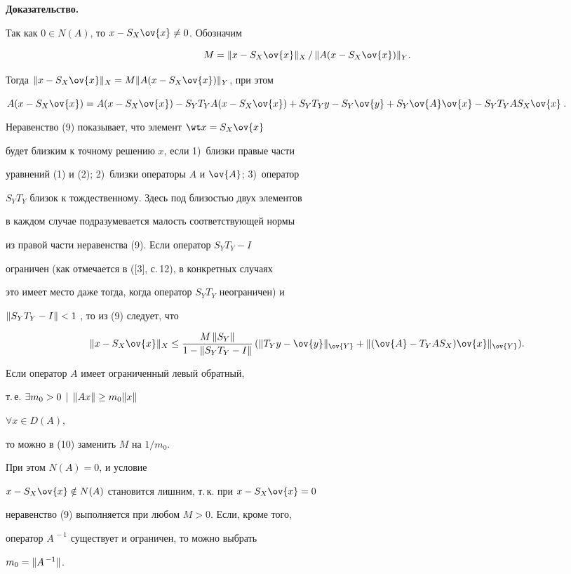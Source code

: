 {\bf Доказательство.}


Так как $0 \in N(A)$, то $x-S_X\ov{x}\ne0$. Обозначим


$$


M=\nr{x-S_X\ov{x}}_X\,/\,\nr{A(x- S_X\ov{x})}_Y.


$$


Тогда $\nr{x-S_X\ov{x}}_X=M\nr{A(x-S_X\ov{x})}_Y$, при этом


$A(x-S_X\ov{x}) = A(x-S_X\ov{x})-S_YT_YA(x-S_X\ov{x})+S_YT_Yy-S_Y\ov{y} +


S_Y\ov{A}\ov{x} -S_YT_YAS_X\ov{x}$.





\begin{note} Неравенство (9) показывает, что элемент $\wt x =S_X\ov{x}$


будет близким к точному решению $x$, если 1)~близки правые части


уравнений (1) и (2); 2)~близки операторы $A$ и $\ov{A}$; 3)~оператор


$S_YT_Y$ близок к тождественному. Здесь под близостью двух элементов


в каждом случае подразумевается малость соответствующей нормы


из правой части неравенства (9). Если оператор $S_YT_Y-I$


ограничен (как отмечается в ([3], с.\,12), в конкретных случаях


это имеет место даже тогда, когда оператор $S_YT_Y$ неограничен) и


$\| {S_YT_Y-I} \|<1$ , то из (9) следует, что


\begin{equation}


\nr{x-S_X\ov{x}}_X \le \frac{M\,\nr{S_Y}}{1-\nr{S_YT_Y-I}}\,


(\nr{T_Yy-\ov{y}}_{\ov{Y}}+\nr{(\ov{A} -T_YAS_X)\ov{x}}_{\ov{Y}}).


\end{equation}


\end{note}





\begin{note} Если оператор $A$ имеет ограниченный левый обратный,


т.\,е. $\exists m_0>0 \,\mid\, \| {Ax} \|\ge m_0\| {x} \|$


$\forall x \in D(A)$,


то можно в (10) заменить $M$ на $1/m_0$.


При этом $N(A)={0}$, и условие


$x-S_X\ov{x} \notin N(A)$ становится лишним, т.\,к. при $x-S_X\ov{x} =0$


неравенство (9) выполняется при любом $M>0$. Если, кроме того,


оператор $A^{\,-1}$ существует и ограничен, то можно выбрать


$m_0=\| {A^{\,-1}} \|$.


\end{note}





